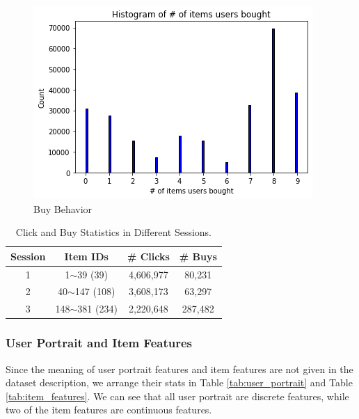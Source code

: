 \begin{figure}
    \centering
    \includegraphics[width=\linewidth]{figures/analysis/buy.png}
    \caption{Buy Behavior}
    \label{fig:analysis:buy}
\end{figure}


\begin{table}[t!]
    \centering
    \caption{Click and Buy Statistics in Different Sessions.}
    \begin{tabular}{c|c|c|c} 
    \hline
    {\color[HTML]{333333} \textbf{Session}} & {\color[HTML]{333333} \textbf{Item IDs}} & {\color[HTML]{333333} \textbf{\# Clicks}} & {\color[HTML]{333333} \textbf{\# Buys}} \\ \hline
    {\color[HTML]{333333} 1} & {\color[HTML]{333333} 1$\sim$39 (39)} & {\color[HTML]{333333} 4,606,977} & {\color[HTML]{333333} 80,231} \\ \hline
    {\color[HTML]{333333} 2} & {\color[HTML]{333333} 40$\sim$147 (108)} & {\color[HTML]{333333} 3,608,173} & {\color[HTML]{333333} 63,297} \\ \hline
    {\color[HTML]{333333} 3} & {\color[HTML]{333333} 148$\sim$381 (234)} & {\color[HTML]{333333} 2,220,648} & {\color[HTML]{333333} 287,482} \\ \hline
    \end{tabular}
    \label{tab:clickbuysess}
\end{table}


\subsubsection{User Portrait and Item Features}
Since the meaning of user portrait features and item features are not given in the dataset description, we arrange their stats in Table \ref{tab:user_portrait} and Table \ref{tab:item_features}.
We can see that all user portrait are discrete features, while two of the item features are continuous features.



